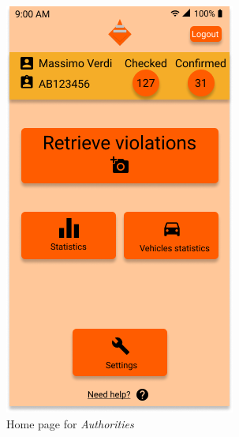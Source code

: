 \documentclass{article}
\begin{document}
\begin{figure}[H]
    \begin{subfigure}{0.5\textwidth}
        \includegraphics[width=0.9\linewidth]{img/mockups/home_authority.png} 
        \caption{Home page for \textit{Authorities}}
        \label{fig:subim1}
    \end{subfigure}
    \begin{subfigure}{0.5\textwidth}

\end{subfigure}
\end{figure}
\end{document}
